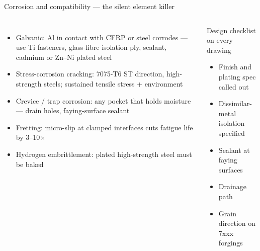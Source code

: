 \documentclass[aspectratio=169,10pt]{beamer}
\begin{document}
\begin{frame}{Corrosion and compatibility --- the silent element killer}
\begin{columns}[T]
\begin{itemize}
  \item \alert{Galvanic}: Al in contact with CFRP or steel corrodes --- use Ti fasteners, glass-fibre isolation ply, sealant, cadmium or Zn--Ni plated steel
  \item \alert{Stress-corrosion cracking}: 7075-T6 ST direction, high-strength steels; sustained tensile stress + environment
  \item \alert{Crevice / trap corrosion}: any pocket that holds moisture --- drain holes, faying-surface sealant
  \item \alert{Fretting}: micro-slip at clamped interfaces cuts fatigue life by 3--10$\times$
  \item \alert{Hydrogen embrittlement}: plated high-strength steel must be baked
\end{itemize}
\begin{block}{Design checklist on every drawing}
\begin{itemize}
  \item Finish and plating spec called out
  \item Dissimilar-metal isolation specified
  \item Sealant at faying surfaces
  \item Drainage path
  \item Grain direction on 7xxx forgings
\end{itemize}
\end{block}
\end{columns}
\end{frame}
\end{document}

